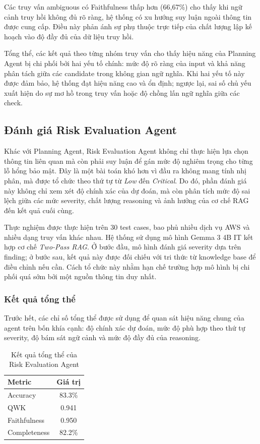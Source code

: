 Các truy vấn ambiguous có Faithfulness thấp hơn (66{,}67\%) cho thấy khi ngữ cảnh truy hồi không đủ rõ ràng, hệ thống có xu hướng suy luận ngoài thông tin được cung cấp. Điều này phản ánh sự phụ thuộc trực tiếp của chất lượng lập kế hoạch vào độ đầy đủ của dữ liệu truy hồi.

Tổng thể, các kết quả theo từng nhóm truy vấn cho thấy hiệu năng của Planning Agent bị chi phối bởi hai yếu tố chính: mức độ rõ ràng của input và khả năng phân tách giữa các candidate trong không gian ngữ nghĩa. Khi hai yếu tố này được đảm bảo, hệ thống đạt hiệu năng cao và ổn định; ngược lại, sai số chủ yếu xuất hiện do sự mơ hồ trong truy vấn hoặc độ chồng lấn ngữ nghĩa giữa các check.


\subsection{Đánh giá Risk Evaluation Agent}

Khác với Planning Agent, Risk Evaluation Agent không chỉ thực hiện lựa chọn thông tin liên quan mà còn phải suy luận để gán mức độ nghiêm trọng cho từng lỗ hổng bảo mật. Đây là một bài toán khó hơn vì đầu ra không mang tính nhị phân, mà được tổ chức theo thứ tự từ \textit{Low} đến \textit{Critical}. Do đó, phần đánh giá này không chỉ xem xét độ chính xác của dự đoán, mà còn phân tích mức độ sai lệch giữa các mức severity, chất lượng reasoning và ảnh hưởng của cơ chế RAG đến kết quả cuối cùng.

Thực nghiệm được thực hiện trên 30 test cases, bao phủ nhiều dịch vụ AWS và nhiều dạng truy vấn khác nhau. Hệ thống sử dụng mô hình Gemma 3 4B IT kết hợp cơ chế \textit{Two-Pass RAG}. Ở bước đầu, mô hình đánh giá severity dựa trên finding; ở bước sau, kết quả này được đối chiếu với tri thức từ knowledge base để điều chỉnh nếu cần. Cách tổ chức này nhằm hạn chế trường hợp mô hình bị chi phối quá sớm bởi một nguồn thông tin duy nhất.

\subsubsection*{Kết quả tổng thể}

Trước hết, các chỉ số tổng thể được sử dụng để quan sát hiệu năng chung của agent trên bốn khía cạnh: độ chính xác dự đoán, mức độ phù hợp theo thứ tự severity, độ bám sát ngữ cảnh và mức độ đầy đủ của reasoning.

\begin{table}[!htb]
\centering
\begin{tabular}{l c}
\hline
Metric & Giá trị \\
\hline
Accuracy & 83.3\% \\
QWK & 0.941 \\
Faithfulness & 0.950 \\
Completeness & 82.2\% \\
\hline
\end{tabular}
\caption{Kết quả tổng thể của Risk Evaluation Agent}
\label{tab:risk_overall}
\end{table}


